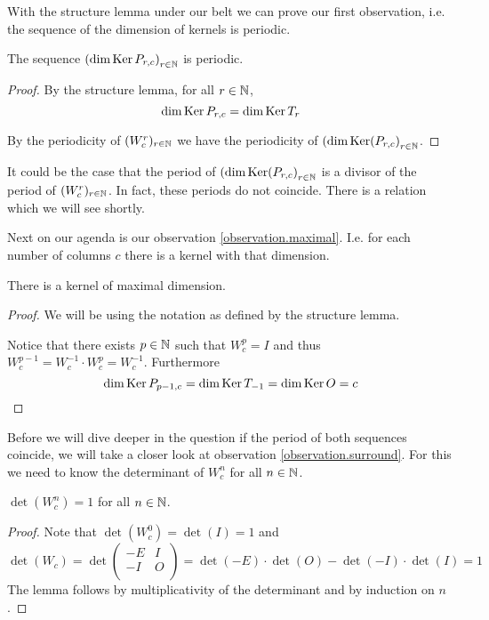With the structure lemma under our belt we can prove our first observation, i.e.
the sequence of the dimension of kernels is periodic.

\begin{proposition}
  The sequence $\left(\dim \operatorname{Ker} P_{r,c}\right)_{r\in\mathbb{N}}$ is periodic.
\end{proposition}

\begin{proof}
  By the structure lemma, for all $r\in\mathbb{N}$,
  \[
  \dim\operatorname{Ker} P_{r,c}
  =
  \dim\operatorname{Ker} T_{r}
  \]

  By the periodicity of $(W_{c}^{r})_{r\in\mathbb{N}}$ we have the
  periodicity of $\left(\dim\operatorname{Ker}(P_{r,c}\right)_{r\in\mathbb{N}}$.
\end{proof}

It could be the case that the period of $\left(\dim\operatorname{Ker}(P_{r,c}\right)_{r\in\mathbb{N}}$
is a divisor of the period of $(W_{c}^{r})_{r\in\mathbb{N}}$. In fact, these periods do
not coincide. There is a relation which we will see shortly.

Next on our agenda is our observation \ref{observation.maximal}. I.e. for each
number of columns $c$ there is a kernel with that dimension.

\begin{lemma}
  There is a kernel of maximal dimension.
\end{lemma}

\begin{proof}
  We will be using the notation as defined by the structure lemma.

  Notice that there exists $p\in\mathbb{N}$ such that $W_{c}^{p} = I$ and
  thus $W_{c}^{p-1} = W_{c}^{-1} \cdot W_{c}^{p} = W_{c}^{-1}$.
  Furthermore
  \[
  \dim\operatorname{Ker} P_{p-1,c}
  =
  \dim\operatorname{Ker} T_{-1}
  =
  \dim\operatorname{Ker} O
  = c
  \]
\end{proof}

Before we will dive deeper in the question if the period of both sequences
coincide, we will take a closer look at observation \ref{observation.surround}.
For this we need to know the determinant of $W_{c}^{n}$ for all $n\in\mathbb{N}$.

\begin{lemma}
  $\det(W_{c}^{n}) = 1$ for all $n\in\mathbb{N}$.
\end{lemma}

\begin{proof}
  Note that $\det(W_{c}^{0}) = \det(I) = 1$ and
  \[
  \det(W_{c}) = \det
  \left(
  \begin{array}{cc}
    -E & I \\
    -I & O \\
  \end{array}
  \right)
  =
  \det(-E) \cdot \det(O) - \det(-I) \cdot \det(I)
  =
  1
  \]
  The lemma follows by multiplicativity of the determinant and
  by induction on $n$.
\end{proof}

